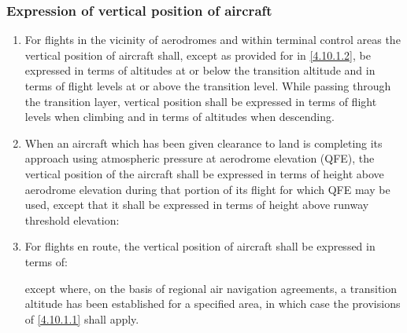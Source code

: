 \documentclass[../vATM.tex]{subfiles}
\begin{document}
    \subsubsection{Expression of vertical position of aircraft}

    \begin{enumerate}
        \item \label{4.10.1.1} For flights in the vicinity of aerodromes and within terminal control areas the vertical position of aircraft shall, except as provided for in \ref{4.10.1.2}, be expressed in terms of altitudes at or below the transition altitude and in terms of flight levels at or above the transition level. While passing through the transition layer, vertical position shall be expressed in terms of flight levels when climbing and in terms of altitudes when descending.
        \item \label{4.10.1.2} When an aircraft which has been given clearance to land is completing its approach using atmospheric pressure at aerodrome elevation (QFE), the vertical position of the aircraft shall be expressed in terms of height above aerodrome elevation during that portion of its flight for which QFE may be used, except that it shall be expressed in terms of height above runway threshold elevation:


        \item For flights en route, the vertical position of aircraft shall be expressed in terms of:


        \noindent except where, on the basis of regional air navigation agreements, a transition altitude has been established for a specified area, in which case the provisions of \ref{4.10.1.1} shall apply.
    \end{enumerate}
\end{document}
